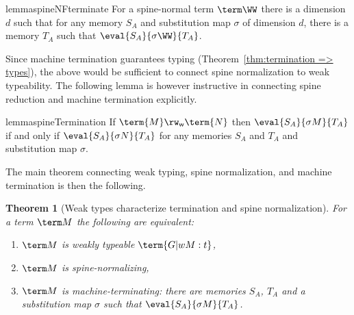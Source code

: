 \documentclass[10pt,a4paper]{amsart}
\newtheorem{theorem}{Theorem}
\newcommand\spine{\mathsf w}
\begin{document}
\begin{restatable}{lemma}{spineNFterminate}
\label{lem:spine-normal => runs}
For a spine-normal term $\term\WW$ there is a dimension $d$ such that for any memory $S_A$ and substitution map $\sigma$ of dimension $d$, there is a memory $T_A$ such that $\eval {S_A}{\sigma\WW}{T_A}$.
\end{restatable}


Since machine termination guarantees typing (Theorem~\ref{thm:termination => types}), the above would be sufficient to connect spine normalization to weak typeability. The following lemma is however instructive in connecting spine reduction and machine termination explicitly.


\begin{restatable}{lemma}{spineTermination}
\label{lem:spine reduction preserves termination}
If $\term{M}\rw_\spine\term{N}$ then $\eval{S_A}{\sigma M}{T_A}$ if and only if $\eval{S_A}{\sigma N}{T_A}$ for any memories $S_A$ and $T_A$ and substitution map $\sigma$.
\end{restatable}


The main theorem connecting weak typing, spine normalization, and machine termination is then the following.


\begin{theorem}[Weak types characterize termination and spine normalization]
\label{thm:weak}
For a term $\term M$ the following are equivalent:
\begin{enumerate}

\item\label{case:w} $\term M$ is weakly typeable $\term{G |w M:t}$,
\item\label{case:s} $\term M$ is spine-normalizing,
\item\label{case:t} $\term M$ is machine-terminating: there are memories $S_A$, $T_A$ and a substitution map $\sigma$ such that $\eval{S_A}{\sigma M}{T_A}$.

\end{enumerate}
\end{theorem}
\end{document}
